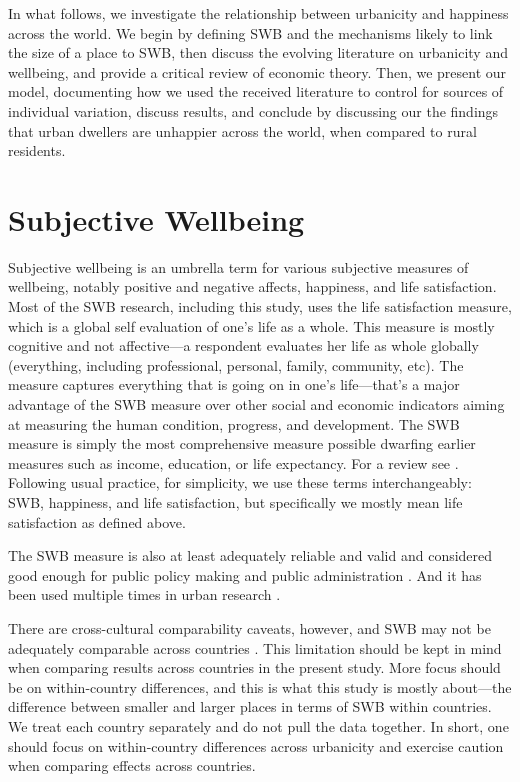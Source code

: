 \documentclass[10pt, letterpaper]{article}
\begin{document}
In what follows, we investigate the relationship between urbanicity and happiness across the world. We begin by defining SWB and the mechanisms likely to link the size of a place to SWB, then discuss the evolving literature on urbanicity and wellbeing, and provide a critical review of economic theory. Then, we present our model, documenting how we used the received literature to control for sources of individual variation, discuss results, and conclude by discussing our the findings that urban dwellers are unhappier across the world, when compared to rural residents. 

   
\section*{Subjective Wellbeing}

Subjective wellbeing is an umbrella term for various subjective measures
of wellbeing, notably positive and negative affects, happiness, and life
satisfaction. Most of the SWB research, including this study, uses the life satisfaction measure, which is a global self evaluation of one's life as a whole. This measure is mostly cognitive and not affective---a respondent evaluates her life as whole globally (everything, including professional, personal, family, community, etc). The measure captures everything that is going on in one's life---that's a major advantage of the SWB measure over other social and economic indicators aiming at measuring the human condition, progress, and development. The SWB measure is simply the most comprehensive measure possible dwarfing earlier measures such as income, education, or life expectancy. For a review see \citet{diener09}.
Following usual practice, for simplicity, we use these terms interchangeably: SWB, happiness, and life satisfaction, but specifically we mostly mean life satisfaction as defined above.

The SWB measure is also at least adequately reliable and valid and considered good
enough for public policy making and public administration \citep{diener09,stiglitz09al}. And it has been used multiple times in urban research \citep[e.g.,][]{moeinaddini20,mouratidis19,wang19,anon17-cities-oslo,ma17,wkeziak16,valente16,chen15}.

There are cross-cultural comparability caveats, however, and SWB may not be
adequately comparable across countries \citep{kahneman99,diener09}. This limitation should be kept in mind when comparing results across countries in the present study. More focus should be on within-country differences, and this is what this study is mostly about---the difference between smaller and larger places in terms of SWB
within countries. We treat each country separately and do not pull the data together. In short, one should focus on within-country differences across urbanicity and exercise caution when comparing effects across countries. 
\end{document}
